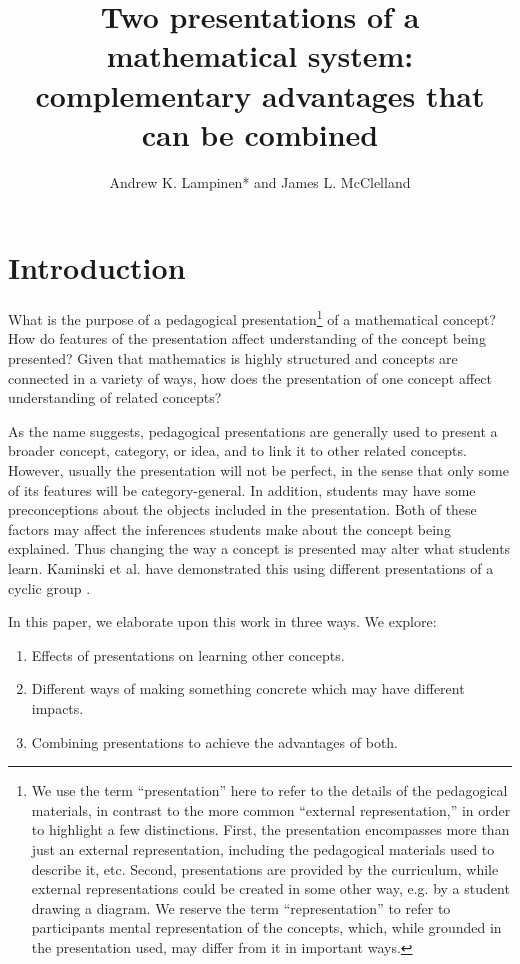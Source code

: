 \documentclass[man,10pt]{apa6}
\title{Two presentations of a mathematical system: complementary advantages that can be combined}
\author{Andrew K. Lampinen* and James L. McClelland}
\affiliation{Department of Psychology, Stanford University}
\date{}
\begin{document}
\maketitle
\section{Introduction}
What is the purpose of a pedagogical presentation\footnote{We use the term ``presentation'' here to refer to the details of the pedagogical materials, in contrast to the more common ``external representation,'' in order to highlight a few distinctions. First, the presentation encompasses more than just an external representation, including the pedagogical materials used to describe it, etc. Second, presentations are provided by the curriculum, while external representations could be created in some other way, e.g. by a student drawing a diagram. We reserve the term ``representation'' to refer to participants mental representation of the concepts, which, while grounded in the presentation used, may differ from it in important ways.} of a mathematical concept? How do features of the presentation affect understanding of the concept being presented? Given that mathematics is highly structured and concepts are connected in a variety of ways, how does the presentation of one concept affect understanding of related concepts?  \par
As the name suggests, pedagogical presentations are generally used to present a broader concept, category, or idea, and to link it to other related concepts. However, usually the presentation will not be perfect, in the sense that only some of its features will be category-general. In addition, students may have some preconceptions about the objects included in the presentation. Both of these factors may affect the inferences students make about the concept being explained. Thus changing the way a concept is presented may alter what students learn. Kaminski et al. have demonstrated this using different presentations of a cyclic group \cite{Kaminski2008}. \par
In this paper, we elaborate upon this work in three ways. We explore:
\begin{enumerate}
\item Effects of presentations on learning other concepts.
\item Different ways of making something concrete which may have different impacts. 
\item Combining presentations to achieve the advantages of both.
\end{enumerate}
\end{document}
